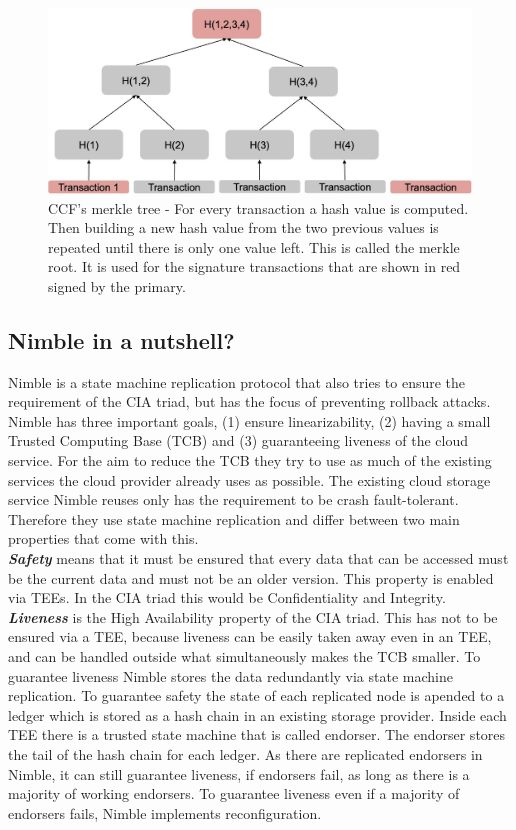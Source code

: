 \begin{figure}[h]
	\includegraphics[scale=0.18]{pictures/merkle_tree}
	\caption{CCF's merkle tree - For every transaction a hash value is computed. Then building a new hash value from the two previous values is repeated until there is only one value left. This is called the merkle root. It is used for the signature transactions that are shown in red signed by the primary.}
	\label{merkle}
\end{figure}



\subsection{Nimble in a nutshell?}
Nimble is a state machine replication protocol that also tries to ensure the requirement of the CIA triad, but has the focus of preventing rollback attacks.
Nimble has three important goals, (1) ensure linearizability, (2) having a small Trusted Computing Base (TCB) and (3) guaranteeing liveness of the cloud service. For the aim to reduce the TCB they try to use as much of the existing services the cloud provider already uses as possible. The existing cloud storage service Nimble reuses only has the requirement to be crash fault-tolerant. Therefore they use state machine replication and differ between two main properties that come with this.\\
	\textbf{\textit{Safety}} means that it must be ensured that every data that can be accessed must be the current data and must not be an older version. This property is enabled via TEEs. In the CIA triad this would be Confidentiality and Integrity.\\
	\textbf{\textit{Liveness}} is the High Availability property of the CIA triad. This has not to be ensured via a TEE, because liveness can be easily taken away even in an TEE, and can be handled outside what simultaneously makes the TCB smaller.
	To guarantee liveness Nimble stores the data redundantly via state machine replication. To guarantee safety the state of each replicated node is apended to a ledger which is stored as a hash chain in an existing storage provider. Inside each TEE there is a trusted state machine that is called endorser. The endorser stores the tail of the hash chain for each ledger. As there are replicated endorsers in Nimble, it can still guarantee liveness, if endorsers fail, as long as there is a majority of working endorsers. To guarantee liveness even if a majority of endorsers fails, Nimble implements reconfiguration. 
